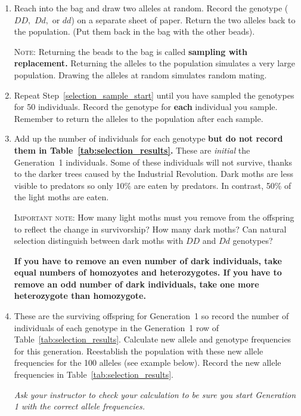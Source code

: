 \documentclass[12pt, hidelinks]{exam}
\newcommand{\allele}[1]{$#1$}
\begin{document}
\begin{questions}
\begin{enumerate}
	\item \label{selection_sample_start} Reach into the bag and draw two alleles at random. Record the genotype (\allele{DD,} \allele{Dd,} or \allele{dd}) on a separate sheet of paper. Return the two alleles back to the population. (Put them back in the bag with the other beads).
	
	\textsc{Note:} Returning the beads to the bag is called \textbf{sampling with replacement.} Returning the alleles to the population simulates a very large population. Drawing the alleles at random simulates random mating.
	
	\item Repeat Step~\ref{selection_sample_start} until you have sampled the genotypes for 50 individuals. Record the genotype for \textbf{each} individual you sample. Remember to return the alleles to the population after each sample. 
	
	\item Add up the number of individuals for each genotype \textbf{ but do not record them in Table~\ref{tab:selection_results}.} These are \emph{initial} the Generation~1 individuals. %
	 Some of these individuals will not survive, thanks to the darker trees caused by the Industrial Revolution. Dark moths are less visible to predators so only 10\% are eaten by predators. In contrast, 50\% of the light moths are eaten. 
	
	\textsc{Important note:} How many light moths must you remove from the offspring to reflect the change in survivorship? How many dark moths? Can natural selection distinguish between dark moths with \allele{DD} and \allele{Dd} genotypes? 
	
	\textbf{If you have to remove an even number of dark individuals, take equal numbers of homozyotes and heterozygotes. If you have to remove an odd number of dark individuals, take one more heterozygote than homozygote.}
	
	\item \label{selection_sample_stop} These are the surviving offspring for Generation~1 so record the number of individuals of each genotype in the Generation~1 row of Table~\ref{tab:selection_results}. Calculate new allele  and genotype frequencies for this generation. Reestablish the population with these new allele frequencies for the 100 alleles (see example below). Record the new allele frequencies in Table~\ref{tab:selection_results}.
	
	\textit{Ask your instructor to check your calculation to be sure you start Generation 1 with the correct allele frequencies.}
	

\end{enumerate}
\end{questions}
\end{document}
